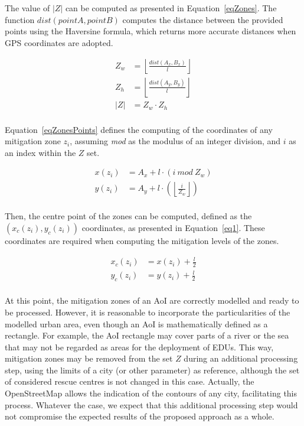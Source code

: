 \begin{refsection}
The value of $|Z|$ can be computed as presented in Equation~\ref{eqZones}. The function $dist(pointA, pointB)$ computes the distance between the provided points using the Haversine formula, which returns more accurate distances when GPS coordinates are adopted. 

\begin{equation}
  \begin{split}
    \displaystyle Z_w &= \left\lfloor \frac{dist(A_x,B_x)}{l} \right\rfloor\\
    \displaystyle Z_h &= \left\lfloor \frac{dist(A_y,B_y)}{l} \right\rfloor\\
    \displaystyle \lvert Z \rvert &= Z_w \cdot Z_h\\
  \end{split}	
  \label{eqZones}
\end{equation}

Equation~\ref{eqZonesPoints} defines the computing of the coordinates of any mitigation zone $z_i$, assuming \textit{mod} as the modulus of an integer division, and $i$ as an index within the $Z$ set.

\begin{equation}
  \begin{split}
    \displaystyle x(z_i) &= A_x + l \cdot (i\ mod\ Z_w)\\
    \displaystyle y(z_i) &= A_y + l \cdot \left(\left\lfloor \frac{i}{Z_w} \right\rfloor\right)\\
  \end{split}	
  \label{eqZonesPoints}
\end{equation}

Then, the centre point of the zones can be computed, defined as the $(x_c(z_i),y_c(z_i))$ coordinates, as presented in Equation~\ref{eq1}. These coordinates are required when computing the mitigation levels of the zones.

\begin{equation}
  \begin{split}
    \displaystyle x_c(z_i) &= x(z_i) + \frac{l}{2}\\
    \displaystyle y_c(z_i) &= y(z_i) + \frac{l}{2}\\
  \end{split}	
  \label{eq1}
\end{equation}

At this point, the mitigation zones of an AoI are correctly modelled and ready to be processed. However, it is reasonable to incorporate the particularities of the modelled urban area, even though an AoI is mathematically defined as a rectangle. For example, the AoI rectangle may cover parts of a river or the sea that may not be regarded as areas for the deployment of EDUs. This way, mitigation zones may be removed from the set $Z$ during an additional processing step, using the limits of a city (or other parameter) as reference, although the set of considered rescue centres is not changed in this case. Actually, the OpenStreetMap allows the indication of the contours of any city, facilitating this process. Whatever the case, we expect that this additional processing step would not compromise the expected results of the proposed approach as a whole.


\end{refsection}
